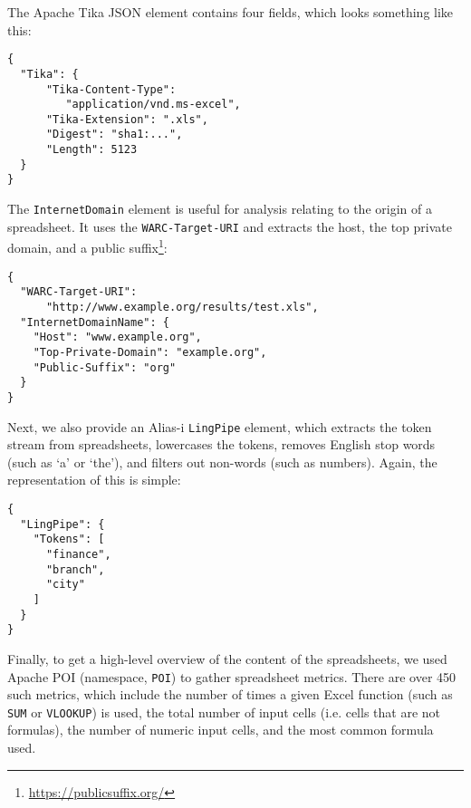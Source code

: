 \documentclass[conference]{IEEEtran}
\begin{document}
The Apache Tika JSON element contains four fields, which looks something like this:

\begin{verbatim}
{
  "Tika": {
      "Tika-Content-Type": 
         "application/vnd.ms-excel",
      "Tika-Extension": ".xls",
      "Digest": "sha1:...",
      "Length": 5123
  }
}
\end{verbatim}

The \texttt{InternetDomain} element is useful for analysis relating to the origin of a spreadsheet. It uses the \texttt{WARC-Target-URI} and extracts the host, the top private domain, and a public suffix\footnote{\url{https://publicsuffix.org/}}:

\begin{verbatim}
{
  "WARC-Target-URI": 
      "http://www.example.org/results/test.xls",
  "InternetDomainName": {
    "Host": "www.example.org",    
    "Top-Private-Domain": "example.org",    
    "Public-Suffix": "org"
  }
}
\end{verbatim}

Next, we also provide an Alias-i \texttt{LingPipe} element, which extracts the token stream from spreadsheets, lowercases the tokens, removes English stop words (such as `a' or `the'), and filters out non-words (such as numbers). Again, the representation of this is simple:

\begin{verbatim}
{
  "LingPipe": {    
    "Tokens": [
      "finance",
      "branch",      
      "city"      
    ]
  }
}
\end{verbatim}

Finally, to get a high-level overview of the content of the spreadsheets, we used Apache POI (namespace, \texttt{POI}) to gather spreadsheet metrics. There are over 450 such metrics, which include the number of times a given Excel function (such as \texttt{SUM} or \texttt{VLOOKUP}) is used, the total number of input cells (i.e. cells that are not formulas), the number of numeric input cells, and the most common formula used.


\end{document}
